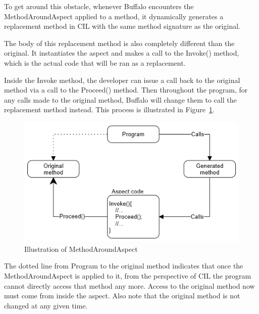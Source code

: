 To get around this obstacle, whenever Buffalo encounters the MethodAroundAspect applied to a method, it dynamically generates a replacement method in CIL with the same method signature as the original.

The body of this replacement method is also completely different than the original. It instantiates the aspect and makes a call to the Invoke() method, which is the actual code that will be ran as a replacement. 

Inside the Invoke method, the developer can issue a call back to the original method via a call to the Proceed() method. Then throughout the program, for any calls made to the original method, Buffalo will change them to call the replacement method instead. This process is illustrated in Figure~\ref{around_overview}.

\begin{figure}[H]
  \includegraphics[scale=1.0]{AroundOverview3.PNG}
  \centering
  \caption{Illustration of MethodAroundAspect\label{around_overview}}
\end{figure}

The dotted line from Program to the original method indicates that once the MethodAroundAspect is applied to it, from the perspective of CIL the program cannot directly access that method any more. Access to the original method now must come from inside the aspect. Also note that the original method is not changed at any given time.
